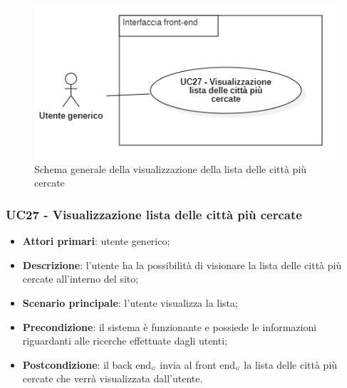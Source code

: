 \begin{center}
	\begin{figure}[H]
		\centering\includegraphics[scale=0.7]{../immagini/attori_casi/UC_27.png}
		\caption{Schema generale della visualizzazione della lista delle città più cercate}
	\end{figure}
\end{center}


\subsubsection{UC27 - Visualizzazione lista delle città più cercate}\label{CasiDUsoCasiDUsoFacoltativiTraUnUtenteEIlFrontEndElencoCasiDUsoUC17VisualizzazioneListaDelleCittaPiuCercate}

\begin{itemize}
	\item \textbf{Attori primari}: utente generico;
	\item \textbf{Descrizione}: l'utente ha la possibilità di visionare la lista delle città più cercate all'interno del sito;
	\item \textbf{Scenario principale}: l'utente visualizza la lista;
	\item \textbf{Precondizione}: il sistema è funzionante e possiede le informazioni riguardanti alle ricerche effettuate dagli utenti;
	\item \textbf{Postcondizione}: il back end$_{\scaleto{G}{3pt}}$ invia al front end$_{\scaleto{G}{3pt}}$ la lista delle città più cercate che verrà visualizzata dall'utente.
\end{itemize}



